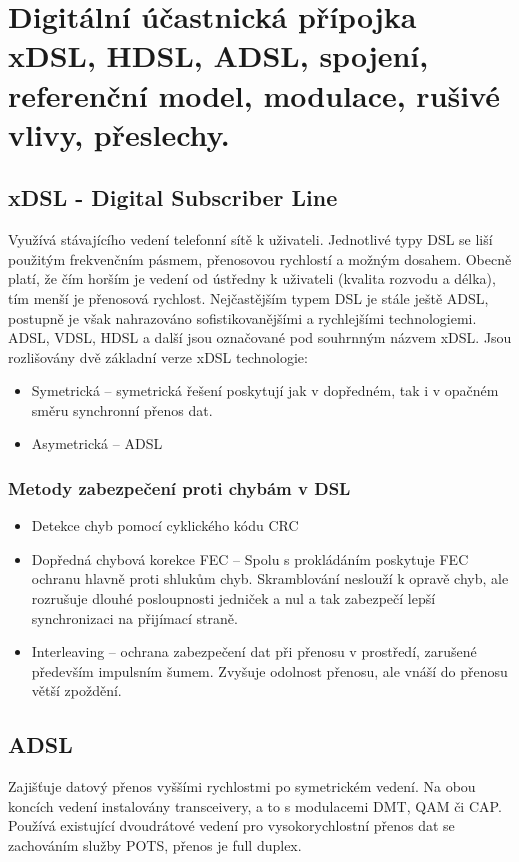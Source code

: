 \clearpage
\section{Digitální účastnická přípojka xDSL, HDSL, ADSL, spojení, referenční model, modulace, rušivé vlivy, přeslechy.}
\subsection{xDSL - Digital Subscriber Line}

Využívá stávajícího vedení telefonní sítě k uživateli. Jednotlivé typy DSL se liší použitým frekvenčním pásmem, přenosovou
rychlostí a možným dosahem. Obecně platí, že čím horším je vedení od ústředny k uživateli (kvalita
rozvodu a délka), tím menší je přenosová rychlost. Nejčastějším typem DSL je stále ještě ADSL, postupně je však nahrazováno
sofistikovanějšími a rychlejšími technologiemi. ADSL, VDSL, HDSL a další jsou označované pod souhrnným názvem xDSL. Jsou rozlišovány dvě základní verze xDSL technologie:
\begin{itemize}
    \item Symetrická -- symetrická řešení poskytují jak v dopředném, tak i v opačném směru synchronní přenos dat.
    \item Asymetrická -- ADSL
\end{itemize}

\subsubsection{Metody zabezpečení proti chybám v DSL}
\begin{itemize}
    \item Detekce chyb pomocí cyklického kódu CRC
    \item Dopředná chybová korekce FEC -- Spolu s prokládáním poskytuje FEC ochranu hlavně proti shlukům chyb. Skramblování neslouží k opravě chyb, ale rozrušuje dlouhé posloupnosti jedniček a nul a tak zabezpečí lepší synchronizaci na přijímací straně.
    \item Interleaving -- ochrana zabezpečení dat při přenosu v prostředí, zarušené především impulsním šumem. Zvyšuje odolnost přenosu, ale vnáší do přenosu větší zpoždění.
\end{itemize}

\subsection{ADSL}
Zajišťuje datový přenos vyššími rychlostmi po symetrickém vedení. Na obou koncích vedení instalovány transceivery, a to s modulacemi DMT, QAM či CAP. Používá existující dvoudrátové vedení pro vysokorychlostní přenos dat se zachováním služby POTS, přenos je full duplex.
